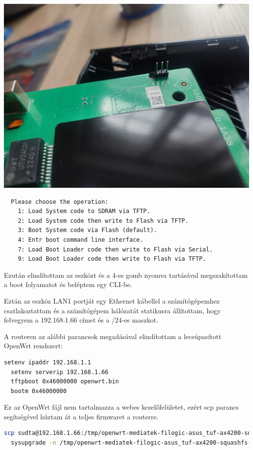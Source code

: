 \documentclass[12pt]{article}
\begin{document}
\includegraphics*[scale=0.30]{./soros-port.jpg}

\begin{lstlisting}
  Please choose the operation:
    1: Load System code to SDRAM via TFTP.
    2: Load System code then write to Flash via TFTP.
    3: Boot System code via Flash (default).
    4: Entr boot command line interface.
    7: Load Boot Loader code then write to Flash via Serial.
    9: Load Boot Loader code then write to Flash via TFTP.
\end{lstlisting}


Ezután elindítottam az eszközt és a 4-es gomb nyomva tartásával megszakítottam a boot folyamatot és beléptem egy CLI-be.

Eztán az eszköz LAN1 portját egy Ethernet kábellel a számítógépemhez csatlakoztattam és a számítógépem hálózatát statikusra állítottam, hogy felvegyem a 192.168.1.66 címet és a /24-es maszkot.

A routeren az alábbi parancsok megadásával elindítottam a lecsúpasított OpenWrt rendszert:

\begin{lstlisting}[language=bash]
  setenv ipaddr 192.168.1.1
  setenv serverip 192.168.1.66
  tftpboot 0x46000000 openwrt.bin
  bootm 0x46000000
\end{lstlisting}

Ez az OpenWrt fájl nem tartalmazza a webes kezelőfelületet, ezért scp parancs segítségével húztam át a teljes firmwaret a routerre.

\begin{lstlisting}[language=bash]
  scp sudta@192.168.1.66:/tmp/openwrt-mediatek-filogic-asus_tuf-ax4200-squashfs-sysupgrade.bin /tmp
  sysupgrade -n /tmp/openwrt-mediatek-filogic-asus_tuf-ax4200-squashfs-sysupgrade.bin
\end{lstlisting}
\end{document}
